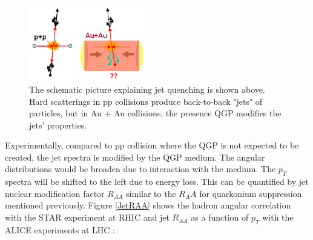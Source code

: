\begin{figure}[hbtp]
\begin{center}
\includegraphics[width=0.45\textwidth]{Figures/Chapter1/JetELoss.png}
\caption{The schematic picture explaining jet quenching is shown above. Hard scatterings in pp collisions produce back-to-back "jets" of particles, but in Au + Au collisions, the presence QGP modifies the jets' properties.}
\label{JetELoss}
\end{center}
\end{figure} 


Experimentally, compared to pp collision where the QGP is not expected to be created, the jet spectra is modified by the QGP medium. The angular distributions would be broaden due to interaction with the medium. The $p_T$ spectra will be shifted to the left due to energy loss. This can be quantified by jet nuclear modification factor $R_{AA}$ similar to the $R_AA$ for quarkonium suppression mentioned previously. Figure \ref{JetRAA} shows the hadron angular correlation with the STAR experiment at RHIC and jet $R_{AA}$ as a function of $p_T$ with the ALICE experiments at LHC \cite{STARJetRef,ALICEJetRef}:
  
